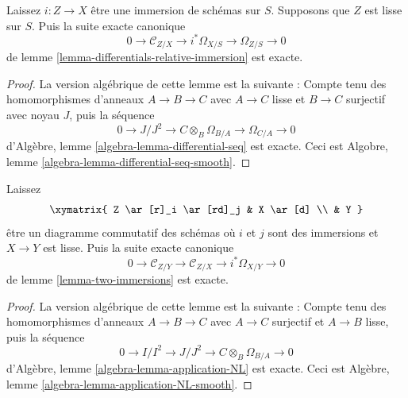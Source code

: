 \begin{lemma}

\label{lemma-differentials-relative-immersion-smooth}
Laissez $i : Z \to X$ être une immersion de schémas sur $S$. Supposons que $Z$ est lisse sur $S$. Puis la suite exacte canonique $$
0 \to \mathcal{C}_{Z/X} \to i^*\Omega_{X/S} \to \Omega_{Z/S} \to 0
$$ de lemme \ref{lemma-differentials-relative-immersion} est exacte.
\end{lemma}

\begin{proof}
La version algébrique de cette lemme est la suivante : Compte tenu des homomorphismes d'anneaux $A \to B \to C$ avec $A \to C$ lisse et $B \to C$ surjectif avec noyau $J$, puis la séquence $$
0 \to J/J^2 \to C \otimes_B \Omega_{B/A} \to \Omega_{C/A} \to 0
$$ d'Algèbre, lemme \ref{algebra-lemma-differential-seq} est exacte. Ceci est Algobre, lemme \ref{algebra-lemma-differential-seq-smooth}.
\end{proof}

\begin{lemma}

\label{lemma-two-immersions-smooth}
Laissez $$
\xymatrix{
Z \ar[r]_i \ar[rd]_j & X \ar[d] \\
& Y
}
$$ être un diagramme commutatif des schémas où $i$ et $j$ sont des immersions et $X \to Y$ est lisse. Puis la suite exacte canonique $$
0 \to  \mathcal{C}_{Z/Y} \to \mathcal{C}_{Z/X} \to i^*\Omega_{X/Y} \to 0
$$ de lemme \ref{lemma-two-immersions} est exacte.
\end{lemma}

\begin{proof}
La version algébrique de cette lemme est la suivante : Compte tenu des homomorphismes d'anneaux $A \to B \to C$ avec $A \to C$ surjectif et $A \to B$ lisse, puis la séquence $$
0 \to I/I^2 \to J/J^2 \to C \otimes_B \Omega_{B/A} \to 0
$$ d'Algèbre, lemme \ref{algebra-lemma-application-NL} est exacte. Ceci est Algèbre, lemme \ref{algebra-lemma-application-NL-smooth}.
\end{proof}

